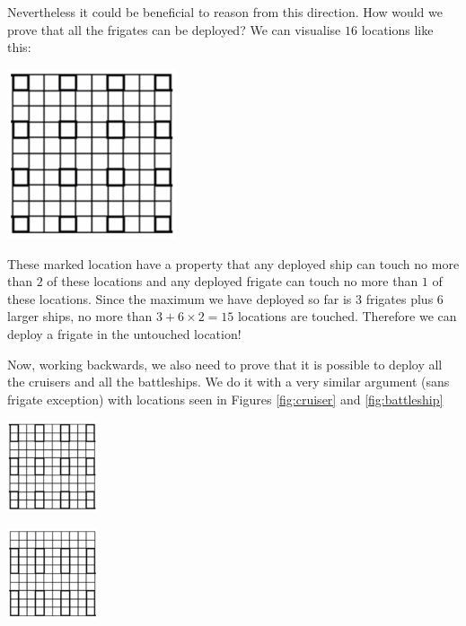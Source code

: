 \begin{problem}
Nevertheless it could be beneficial to reason from this direction. How would we prove that all the frigates can be deployed? We can visualise $16$ locations like this:

\begin{center}
\includegraphics[width=5cm]{SpotForFrigate.png}
\label{fig:SpotForFrigate}
\end{center}

These marked location have a property that any deployed ship can touch no more than $2$ of these locations and any deployed frigate can touch no more than $1$ of these locations. 
Since the maximum we have deployed so far is $3$ frigates plus $6$ larger ships, no more than $3+6\times 2= 15$ locations are touched. 
Therefore we can deploy a frigate in the untouched location!

Now, working backwards, we also need to prove that it is possible to deploy all the cruisers and all the battleships. We do it with a very similar argument (sans frigate exception) with 
locations seen in Figures \ref{fig:cruiser} and \ref{fig:battleship}


\begin{center}
\includegraphics[width=0.20\textwidth]{PlaceForCruiser.png}
\label{fig:cruiser}
\end{center}

\begin{center}
\includegraphics[width=0.20\textwidth]{PlaceForBattleship.png}
\label{fig:battleship}
\end{center}



\end{problem}
%

